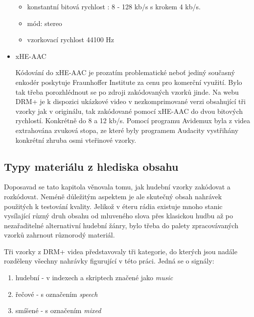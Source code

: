 \begin{itemize}
    \begin{itemize}
        \item konstantní bitová rychlost : 8 - 128 kb/s s krokem 4 kb/s.
        \item mód: stereo
        \item vzorkovací rychlost 44100 Hz
    \end{itemize}

    \item xHE-AAC
    
    Kódování do xHE-AAC je prozatím problematické neboť jediný současný enkodér poskytuje Fraunhoffer Institute za cenu pro komerční využití. Bylo tak třeba porozhlédnout se po zdroji zakódovaných vzorků jinde.
    Na webu DRM+ \cite{web:drm} je k dispozici ukázkové video v nezkomprimované verzi obsahující tři vzorky jak v originálu, tak zakódované pomocí xHE-AAC do dvou bitových rychlostí. Konkrétně do 8 a 12 kb/s. Pomocí programu Avidemux \cite{web:avidemux} byla z videa extrahována zvuková stopa, ze které byly programem Audacity \cite{web:audacity} vystřihány konkrétní zhruba osmi vteřinové vzorky.
    
\end{itemize}

\subsection{Typy materiálu z hlediska obsahu}
\label{subchap:material}

Doposavad se tato kapitola věnovala tomu, jak hudební vzorky zakódovat a rozkódovat. Neméně důležitým aspektem je ale skutečný obsah nahrávek použitých k testování kvality. Jelikož v éteru rádia existuje mnoho stanic vysílající různý druh obsahu od mluveného slova přes klasickou hudbu až po nezařaditelné alternativní hudební žánry, bylo třeba do palety zpracovávaných vzorků zahrnout různorodý materiál.

Tři vzorky z DRM+ videa představovaly tři kategorie, do kterých jsou nadále rozděleny všechny nahrávky figurující v této práci. Jedná se o signály:

\begin{enumerate}
    \item hudební - v indexech a skriptech značené jako \textit{music}
    \item řečové - s označením \textit{speech}
    \item smíšené - s označením \textit{mixed}
\end{enumerate}

